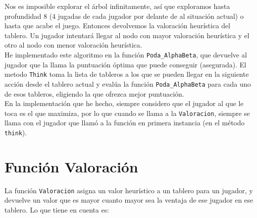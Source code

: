 \documentclass{article}
\begin{document}
Nos es imposible explorar el árbol infinitamente, así que exploramos
hasta profundidad 8 (4 jugadas de cada jugador por delante de al
situación actual) o hasta que acabe el juego. Entonces devolvemos la
valoración heurística del tablero. Un jugador intentará llegar al nodo
con mayor valoración heurística y el otro al nodo con menor valoración
heurística. \\

He implementado este algoritmo en la función \texttt{Poda\_AlphaBeta},
que devuelve al jugador que la llama la puntuación óptima que puede
conseguir (asegurada). El metodo \texttt{Think} toma la lista de
tableros a los que se pueden llegar en la siguiente acción desde el
tablero actual y evalúa la función \texttt{Poda\_AlphaBeta} para cada
uno de esos tableros, eligiendo la que ofrezca mejor puntuación. \\

En la implementación que he hecho, siempre considero que el jugador al
que le toca es el que maximiza, por lo que cuando se llama a la
\texttt{Valoracion}, siempre se llama con el jugador que llamó a la
función en primera instancia (en el método \texttt{think}).


\section{Función Valoración}

La función \texttt{Valoracion} asigna un valor heurístico a un tablero
para un jugador, y devuelve un valor que es mayor cuanto mayor sea la
ventaja de ese jugador en ese tablero. Lo que tiene en cuenta es:
\end{document}
